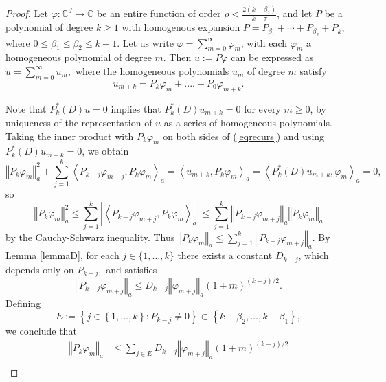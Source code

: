 \documentclass[12pt]{amsart}
\begin{document}
\begin{proof}
	Let $\varphi:\mathbb{C}^{d}\rightarrow\mathbb{C}$ be an entire function of
	order $\rho<\frac{2\left(  k-\beta_{2}\right)  }{k-\tau}$, and let $P$ be a
	polynomial of degree $k\geq1$ with homogenous expansion $P=P_{\beta_{1}%
	}+\cdots+P_{\beta_{2}}+P_{k}$, where $0\leq\beta_{1}\leq\beta_{2}\leq k-1.$
	Let us write $\varphi=\sum_{m=0}^{\infty}\varphi_{m}$, with each $\varphi_{m}$
	a homogeneous polynomial of degree $m$. Then $u:=P\varphi$ can be expressed as
	$u=\sum_{m=0}^{\infty}u_{m},$ where the homogeneous polynomials $u_{m}$ of
	degree $m$ satisfy
	\begin{equation}
		u_{m+k}=P_{k}\varphi_{m}+....+P_{0}\varphi_{m+k}.\label{eqrecurs}%
	\end{equation}
	
	
	Note that $P_{k}^{\ast}\left(  D\right)  u=0$ implies that $P_{k}^{\ast
	}\left(  D\right)  u_{m+k}=0$ for every $m \ge 0$, by uniqueness of the representation of $u$ as a
	series of homogeneous polynomials. Taking the inner product with $P_{k}%
	\varphi_{m}$ on both sides of (\ref{eqrecurs}) and using $P_{k}^{\ast}\left(
	D\right)  u_{m+k}=0$, we obtain
	\[
	\left\Vert P_{k}\varphi_{m}\right\Vert _{a}^{2}+\sum_{j=1}^{k}\left\langle
	P_{k-j}\varphi_{m+j},P_{k}\varphi_{m}\right\rangle _{a}=\left\langle
	u_{m+k},P_{k}\varphi_{m}\right\rangle _{a}=\left\langle P_{k}^{\ast}\left(
	D\right)  u_{m+k},\varphi_{m}\right\rangle _{a}=0,
	\]
	so
	\[
	\left\Vert P_{k}\varphi_{m}\right\Vert _{a}^{2}\leq\sum_{j=1}^{k}\left\vert
	\left\langle P_{k-j}\varphi_{m+j},P_{k}\varphi_{m}\right\rangle _{a}%
	\right\vert \leq\sum_{j=1}^{k}\left\Vert P_{k-j}\varphi_{m+j}\right\Vert
	_{a}\left\Vert P_{k}\varphi_{m}\right\Vert _{a}%
	\]
	by the Cauchy-Schwarz inequality. Thus $\left\Vert P_{k}\varphi_{m}\right\Vert
	_{a}\leq\sum_{j=1}^{k}\left\Vert P_{k-j}\varphi_{m+j}\right\Vert _{a}.$ By
	Lemma \ref{lemmaD}, for each $j\in\{1,\dots,k\}$ there exists a constant
	$D_{k-j}$, which depends only on $P_{k-j},$ and satisfies
	\[
	\left\Vert P_{k-j}\varphi_{m+j}\right\Vert _{a}\leq D_{k-j}\left\Vert
	\varphi_{m+j}\right\Vert _{a}\left(  1+m\right)  ^{\left(  k-j\right)  /2}.
	\]
	Defining
	\[
	E:=\left\{  j\in\left\{  1,\dots,k\right\}  :P_{k-j}\neq0\right\}
	\subset\left\{  k-\beta_{2},\dots,k-\beta_{1}\right\}  ,
	\]
	we conclude that
	\begin{align*}
		\left\Vert P_{k}\varphi_{m}\right\Vert _{a} &  \leq\sum_{j\in E}%
		D_{k-j}\left\Vert \varphi_{m+j}\right\Vert _{a}\left(  1+m\right)  ^{\left(
			k-j\right)  /2}\\

\end{align*}
\end{proof}
\end{document}
